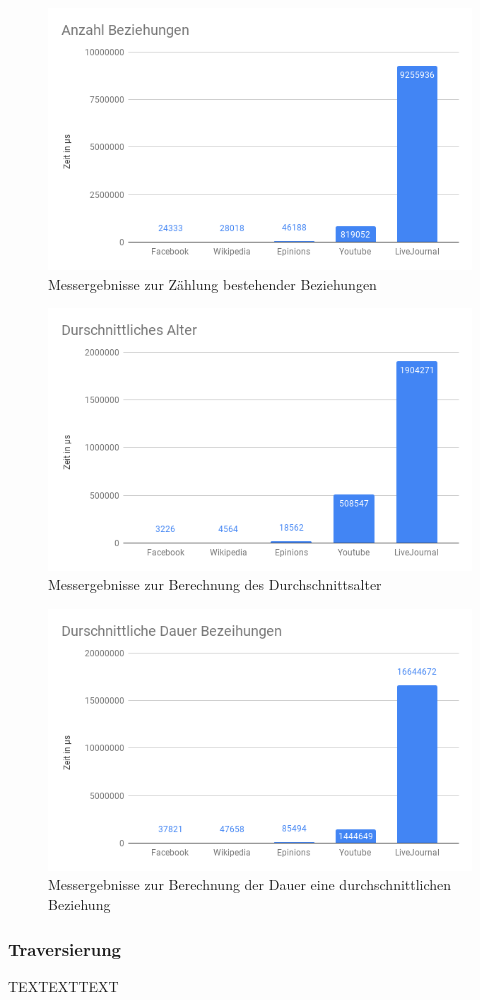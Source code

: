 \begin{figure}
	\centering
	\includegraphics[width=\textwidth]{images/AnzahlBeziehung.png}
	\caption{Messergebnisse zur Zählung bestehender Beziehungen}
	\label{fig:AnzahlBeziehung}
\end{figure}

\begin{figure}
	\centering
	\includegraphics[width=\textwidth]{images/DurschAlter.png}
	\caption{Messergebnisse zur Berechnung des Durchschnittsalter}
	\label{fig:DurschAlter}
\end{figure}

\begin{figure}
	\centering
	\includegraphics[width=\textwidth]{images/DurschBeziehung.png}
	\caption{Messergebnisse zur Berechnung der Dauer eine durchschnittlichen Beziehung}
	\label{fig:DurschBeziehung}
\end{figure}

\newpage

\subsubsection{Traversierung}
TEXTEXTTEXT